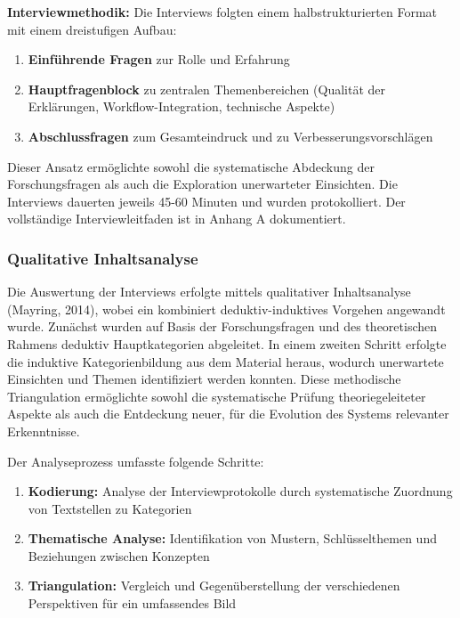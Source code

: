 \documentclass[
  a4paper,
  12pt,
  oneside,
  open=any,
  BCOR=12mm,
  DIV=14,
  parskip=half*,
  headsepline,
  footsepline,
  pointlessnumbers,
  liststotoc,
  numbers=noenddot,
  listof=totoc]{scrartcl}
\providecommand{\tightlist}{%
  \setlength{\itemsep}{0pt}\setlength{\parskip}{0pt}}\usepackage{longtable,booktabs,array}
\begin{document}
\textbf{Interviewmethodik:} Die Interviews folgten einem
halbstrukturierten Format mit einem dreistufigen Aufbau:

\begin{enumerate}
\def\labelenumi{\arabic{enumi}.}
\tightlist
\item
  \textbf{Einführende Fragen} zur Rolle und Erfahrung
\item
  \textbf{Hauptfragenblock} zu zentralen Themenbereichen (Qualität der
  Erklärungen, Workflow-Integration, technische Aspekte)
\item
  \textbf{Abschlussfragen} zum Gesamteindruck und zu
  Verbesserungsvorschlägen
\end{enumerate}

Dieser Ansatz ermöglichte sowohl die systematische Abdeckung der
Forschungsfragen als auch die Exploration unerwarteter Einsichten. Die
Interviews dauerten jeweils 45-60 Minuten und wurden protokolliert. Der
vollständige Interviewleitfaden ist in Anhang A dokumentiert.

\subsubsection{Qualitative
Inhaltsanalyse}\label{qualitative-inhaltsanalyse}

Die Auswertung der Interviews erfolgte mittels qualitativer
Inhaltsanalyse (Mayring, 2014), wobei ein kombiniert deduktiv-induktives
Vorgehen angewandt wurde. Zunächst wurden auf Basis der Forschungsfragen
und des theoretischen Rahmens deduktiv Hauptkategorien abgeleitet. In
einem zweiten Schritt erfolgte die induktive Kategorienbildung aus dem
Material heraus, wodurch unerwartete Einsichten und Themen identifiziert
werden konnten. Diese methodische Triangulation ermöglichte sowohl die
systematische Prüfung theoriegeleiteter Aspekte als auch die Entdeckung
neuer, für die Evolution des Systems relevanter Erkenntnisse.

Der Analyseprozess umfasste folgende Schritte:

\begin{enumerate}
\def\labelenumi{\arabic{enumi}.}
\tightlist
\item
  \textbf{Kodierung:} Analyse der Interviewprotokolle durch
  systematische Zuordnung von Textstellen zu Kategorien
\item
  \textbf{Thematische Analyse:} Identifikation von Mustern,
  Schlüsselthemen und Beziehungen zwischen Konzepten
\item
  \textbf{Triangulation:} Vergleich und Gegenüberstellung der
  verschiedenen Perspektiven für ein umfassendes Bild
\end{enumerate}
\end{document}
